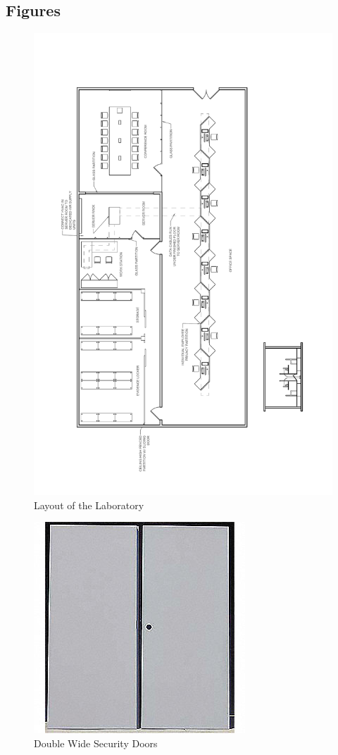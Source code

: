 \documentclass{article}
\begin{document}
\subsection{Figures}
\begin{figure}[H]
   \centering
       \includegraphics[page=1,angle=180,width=.8\textwidth]{layout-thx-nick-millet.pdf}
 \caption{Layout of the Laboratory}
 \label{fig:Layout}
\end{figure}
\begin{figure}[H]
   \centering
       \includegraphics{figures/doubledoor.jpg}
 \caption{Double Wide Security Doors}
 \label{fig:Double Doors}
\end{figure}
\end{document}
